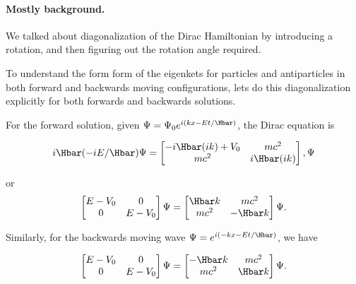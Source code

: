 %
%

\paragraph{Mostly background.}

We talked about diagonalization of the Dirac Hamiltonian by introducing a rotation, and then figuring out the rotation angle required.

To understand the form form of the eigenkets for particles and antiparticles in both forward and backwards moving configurations, lets do this diagonalization explicitly for both forwards and backwards solutions.

For the forward solution, given \( \Psi = \Psi_0 e^{i(k x - E t/\Hbar) } \), the Dirac equation is

\begin{dmath}\label{eqn:gradQuantumProblemSet4Problem3:20}
i \Hbar (-i E/\Hbar) \Psi =
\begin{bmatrix}
-i \Hbar (i k) + V_0 & m c^2 \\
m c^2 & i \Hbar (i k)
\end{bmatrix},
\Psi
\end{dmath}

or
\begin{dmath}\label{eqn:gradQuantumProblemSet4Problem3:40}
\begin{bmatrix}
E - V_0 & 0 \\
0 & E - V_0
\end{bmatrix}
\Psi
=
\begin{bmatrix}
\Hbar k & m c^2 \\
m c^2 &  - \Hbar k
\end{bmatrix}
\Psi.
\end{dmath}

Similarly, for the backwards moving wave \( \Psi = e^{i(-k x - E t/\Hbar)} \), we have

\begin{dmath}\label{eqn:gradQuantumProblemSet4Problem3:60}
\begin{bmatrix}
E - V_0 & 0 \\
0 & E - V_0
\end{bmatrix}
\Psi
=
\begin{bmatrix}
-\Hbar k & m c^2 \\
m c^2 & \Hbar k
\end{bmatrix}
\Psi.
\end{dmath}

